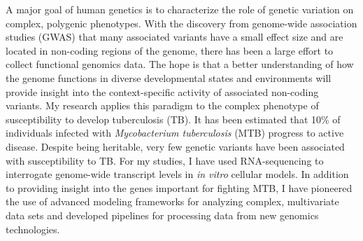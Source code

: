 \abstract
A major goal of human genetics is to characterize the role of genetic
variation on complex, polygenic phenotypes. With the discovery from
genome-wide association studies (GWAS) that many associated variants
have a small effect size and are located in non-coding regions of the
genome, there has been a large effort to collect functional genomics
data. The hope is that a better understanding of how the genome
functions in diverse developmental states and environments will provide
insight into the context-specific activity of associated non-coding
variants. My research applies this paradigm to the complex phenotype of
susceptibility to develop tuberculosis (TB). It has been estimated that
10\% of individuals infected with \emph{Mycobacterium tuberculosis}
(MTB) progress to active disease. Despite being heritable, very few
genetic variants have been associated with susceptibility to TB. For my
studies, I have used RNA-sequencing to interrogate genome-wide
transcript levels in \emph{in vitro} cellular models. In addition to
providing insight into the genes important for fighting MTB, I have
pioneered the use of advanced modeling frameworks for analyzing complex,
multivariate data sets and developed pipelines for processing data from
new genomics technologies.
